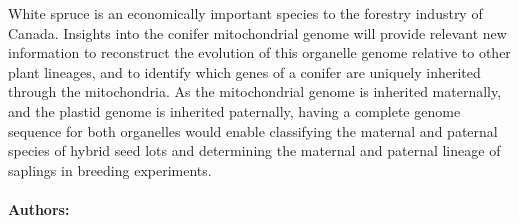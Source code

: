 White spruce is an economically important species to the forestry industry of Canada. Insights
into the conifer mitochondrial genome will provide relevant new information to reconstruct the
evolution of this organelle genome relative to other plant lineages, and to identify which genes
of a conifer are uniquely inherited through the mitochondria. As the mitochondrial genome is
inherited maternally, and the plastid genome is inherited paternally, having a complete genome
sequence for both organelles would enable classifying the maternal and paternal species of hybrid
seed lots and determining the maternal and paternal lineage of saplings in breeding experiments.

\noindent \paragraph{Authors:} 

\paragraph{}

